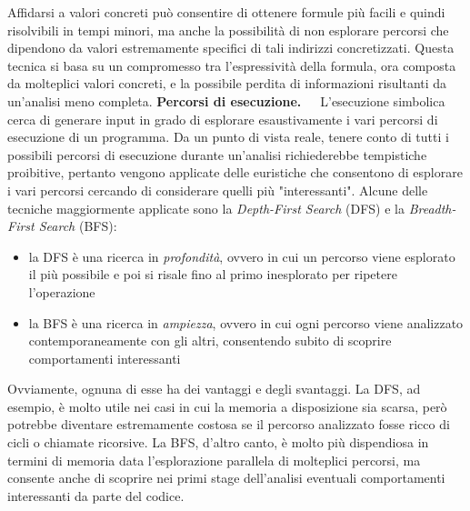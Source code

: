 \documentclass[Lau, oneside]{sapthesis}%
\begin{document}
\newpage
Affidarsi a valori concreti può consentire di ottenere formule più facili e quindi risolvibili in tempi minori, ma anche la possibilità di non esplorare percorsi che dipendono da valori estremamente specifici di tali indirizzi concretizzati.
\newline
Questa tecnica si basa su un compromesso tra l'espressività della formula, ora composta da molteplici valori concreti, e la possibile perdita di informazioni risultanti da un'analisi meno completa.
\newline \newline \newline
\textbf{Percorsi di esecuzione.}\ \ \ L’esecuzione simbolica cerca di generare input in grado di esplorare esaustivamente i vari percorsi di esecuzione di un programma.
\newline
Da un punto di vista reale, tenere conto di tutti i possibili percorsi di esecuzione durante un'analisi richiederebbe tempistiche proibitive, pertanto vengono applicate delle euristiche che consentono di esplorare i vari percorsi cercando di considerare quelli più "interessanti".
\newline \newline
Alcune delle tecniche maggiormente applicate sono la \textit{Depth-First Search} (DFS) e la \textit{Breadth-First Search} (BFS):
\begin{itemize}
    \item la DFS è una ricerca in \textit{profondità}, ovvero in cui un percorso viene esplorato il più possibile e poi si risale fino al primo inesplorato per ripetere l'operazione
    \item la BFS è una ricerca in \textit{ampiezza}, ovvero in cui ogni percorso viene analizzato contemporaneamente con gli altri, consentendo subito di scoprire comportamenti interessanti
\end{itemize}
Ovviamente, ognuna di esse ha dei vantaggi e degli svantaggi.
\newline
La DFS, ad esempio, è molto utile nei casi in cui la memoria a disposizione sia scarsa, però potrebbe diventare estremamente costosa se il percorso analizzato fosse ricco di cicli o chiamate ricorsive.
\newline
La BFS, d'altro canto, è molto più dispendiosa in termini di memoria data l'esplorazione parallela di molteplici percorsi, ma consente anche di scoprire nei primi stage dell'analisi eventuali comportamenti interessanti da parte del codice.
\newline \newline
\end{document}
